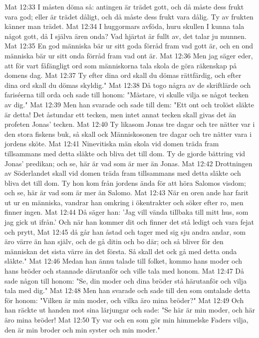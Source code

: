 Mat 12:33  I måsten döma så: antingen är trädet gott, och då måste dess frukt vara god; eller är trädet dåligt, och då måste dess frukt vara dålig. Ty av frukten känner man trädet.
Mat 12:34  I huggormars avföda, huru skullen I kunna tala något gott, då I själva ären onda? Vad hjärtat är fullt av, det talar ju munnen.
Mat 12:35  En god människa bär ur sitt goda förråd fram vad gott är, och en ond människa bär ur sitt onda förråd fram vad ont är.
Mat 12:36  Men jag säger eder, att för vart fåfängligt ord som människorna tala skola de göra räkenskap på domens dag.
Mat 12:37  Ty efter dina ord skall du dömas rättfärdig, och efter dina ord skall du dömas skyldig."
Mat 12:38  Då togo några av de skriftlärde och fariséerna till orda och sade till honom: "Mästare, vi skulle vilja se något tecken av dig."
Mat 12:39  Men han svarade och sade till dem: "Ett ont och trolöst släkte är detta! Det åstundar ett tecken, men intet annat tecken skall givas det än profeten Jonas' tecken.
Mat 12:40  Ty likasom Jonas tre dagar och tre nätter var i den stora fiskens buk, så skall ock Människosonen tre dagar och tre nätter vara i jordens sköte.
Mat 12:41  Ninevitiska män skola vid domen träda fram tillsammans med detta släkte och bliva det till dom. Ty de gjorde bättring vid Jonas' predikan; och se, här är vad som är mer än Jonas.
Mat 12:42  Drottningen av Söderlandet skall vid domen träda fram tillsammans med detta släkte och bliva det till dom. Ty hon kom från jordens ända för att höra Salomos visdom; och se, här är vad som är mer än Salomo.
Mat 12:43  När en oren ande har farit ut ur en människa, vandrar han omkring i ökentrakter och söker efter ro, men finner ingen.
Mat 12:44  Då säger han: 'Jag vill vända tillbaka till mitt hus, som jag gick ut ifrån.' Och när han kommer dit och finner det stå ledigt och vara fejat och prytt,
Mat 12:45  då går han åstad och tager med sig sju andra andar, som äro värre än han själv, och de gå ditin och bo där; och så bliver för den människan det sista värre än det första. Så skall det ock gå med detta onda släkte."
Mat 12:46  Medan han ännu talade till folket, kommo hans moder och hans bröder och stannade därutanför och ville tala med honom.
Mat 12:47  Då sade någon till honom: "Se, din moder och dina bröder stå härutanför och vilja tala med dig."
Mat 12:48  Men han svarade och sade till den som omtalade detta för honom: "Vilken är min moder, och vilka äro mina bröder?"
Mat 12:49  Och han räckte ut handen mot sina lärjungar och sade: "Se här är min moder, och här äro mina bröder!
Mat 12:50  Ty var och en som gör min himmelske Faders vilja, den är min broder och min syster och min moder."
